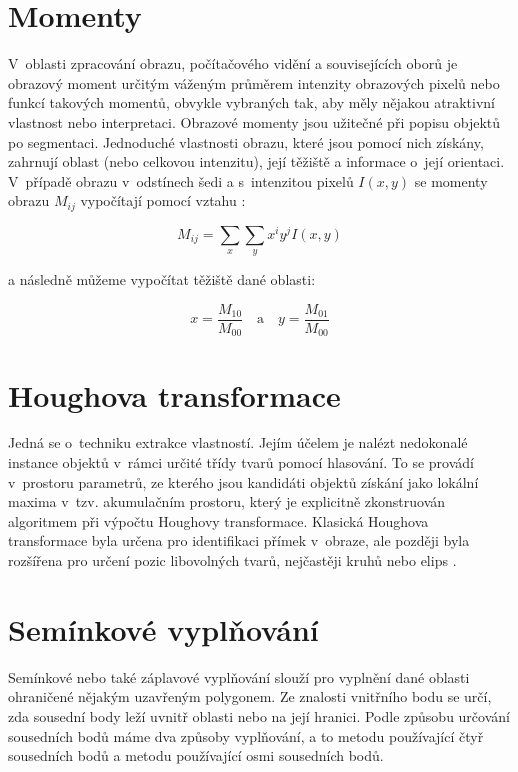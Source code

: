 \pagebreak
\section{Momenty}
V~oblasti zpracování obrazu, počítačového vidění a souvisejících oborů je obrazový moment určitým váženým průměrem intenzity obrazových pixelů nebo funkcí takových momentů, obvykle vybraných tak, aby měly nějakou atraktivní vlastnost nebo interpretaci. Obrazové momenty jsou užitečné při popisu objektů po segmentaci. Jednoduché vlastnosti obrazu, které jsou pomocí nich získány, zahrnují oblast (nebo celkovou intenzitu), její těžiště a informace o~její orientaci. V~případě obrazu v~odstínech šedi a s~intenzitou pixelů $I(x,y)$ se momenty obrazu $M_{ij}$ vypočítají pomocí vztahu \cite{img_moments}:

\begin{equation}
M_{ij} = \sum_{x}\sum_{y} x^i y^j I(x,y)
\end{equation}

\noindent a následně můžeme vypočítat těžiště dané oblasti:

\begin{equation}
x = \frac{M_{10}}{M_{00}} \quad \text{a} \quad y = \frac{M_{01}}{M_{00}}
\end{equation}

\section{Houghova transformace}
Jedná se o~techniku extrakce vlastností. Jejím účelem je nalézt nedokonalé instance objektů v~rámci určité třídy tvarů pomocí hlasování. To se provádí v~prostoru parametrů, ze kterého jsou kandidáti objektů získání jako lokální maxima v~tzv. akumulačním prostoru, který je explicitně zkonstruován algoritmem při výpočtu Houghovy transformace. Klasická Houghova transformace byla určena pro identifikaci přímek v~obraze, ale později byla rozšířena pro určení pozic libovolných tvarů, nejčastěji kruhů nebo elips \cite{comp_vision}.

\section{Semínkové vyplňování}
Semínkové nebo také záplavové vyplňování slouží pro vyplnění dané oblasti ohraničené nějakým uzavřeným polygonem. Ze znalosti vnitřního bodu se určí, zda sousední body leží uvnitř oblasti nebo na její hranici. Podle způsobu určování sousedních bodů máme dva způsoby vyplňování, a to metodu používající čtyř sousedních bodů a metodu používající osmi sousedních bodů.

